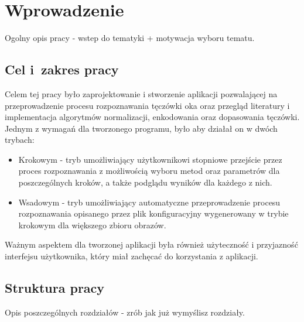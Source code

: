 \chapter{Wprowadzenie}


Ogolny opis pracy - wstep do tematyki + motywacja wyboru tematu.

\section{Cel i~zakres pracy}

Celem tej pracy było zaprojektowanie i stworzenie aplikacji pozwalającej na przeprowadzenie procesu
rozpoznawania tęczówki oka oraz przegląd literatury i implementacja algorytmów normalizacji,
enkodowania oraz dopasowania tęczówki. Jednym z wymagań dla tworzonego programu, było aby działał
on w dwóch trybach:

\begin{itemize}
    \item Krokowym - tryb umożliwiający użytkownikowi stopniowe przejście przez proces rozpoznawania
    z możliwością wyboru metod oraz parametrów dla poszczególnych kroków, a także podglądu wyników dla
    każdego z nich.

    \item Wsadowym - tryb umożliwiający automatyczne przeprowadzenie procesu rozpoznawania opisanego przez
    plik konfiguracyjny wygenerowany w trybie krokowym dla większego zbioru obrazów.
\end{itemize}

\noindent
Ważnym aspektem dla tworzonej aplikacji była również użyteczność i przyjazność interfejsu użytkownika,
który miał zachęcać do korzystania z aplikacji.

\section{Struktura pracy}

Opis poszczególnych rozdziałów - zrób jak już wymyślisz rozdziały.

